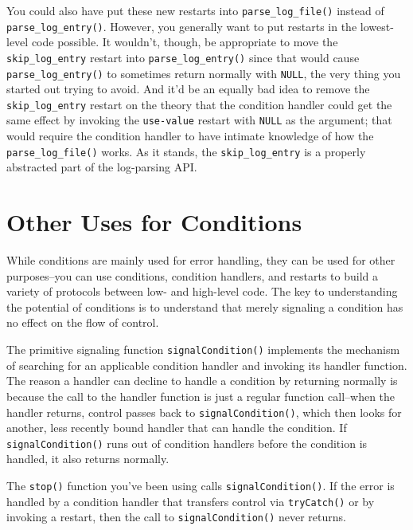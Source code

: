 You could also have put these new restarts into
\texttt{parse\_log\_file()} instead of \texttt{parse\_log\_entry()}.
However, you generally want to put restarts in the lowest-level code
possible. It wouldn't, though, be appropriate to move the
\texttt{skip\_log\_entry} restart into \texttt{parse\_log\_entry()}
since that would cause \texttt{parse\_log\_entry()} to sometimes return
normally with \texttt{NULL}, the very thing you started out trying to
avoid. And it'd be an equally bad idea to remove the
\texttt{skip\_log\_entry} restart on the theory that the condition
handler could get the same effect by invoking the \texttt{use-value}
restart with \texttt{NULL} as the argument; that would require the
condition handler to have intimate knowledge of how the
\texttt{parse\_log\_file()} works. As it stands, the
\texttt{skip\_log\_entry} is a properly abstracted part of the
log-parsing API.

\section{Other Uses for Conditions}

While conditions are mainly used for error handling, they can be used
for other purposes--you can use conditions, condition handlers, and
restarts to build a variety of protocols between low- and high-level
code. The key to understanding the potential of conditions is to
understand that merely signaling a condition has no effect on the flow
of control.

The primitive signaling function \texttt{signalCondition()} implements
the mechanism of searching for an applicable condition handler and
invoking its handler function. The reason a handler can decline to
handle a condition by returning normally is because the call to the
handler function is just a regular function call--when the handler
returns, control passes back to \texttt{signalCondition()}, which then
looks for another, less recently bound handler that can handle the
condition. If \texttt{signalCondition()} runs out of condition handlers
before the condition is handled, it also returns normally.

The \texttt{stop()} function you've been using calls
\texttt{signalCondition()}. If the error is handled by a condition
handler that transfers control via \texttt{tryCatch()} or by invoking a
restart, then the call to \texttt{signalCondition()} never returns.

